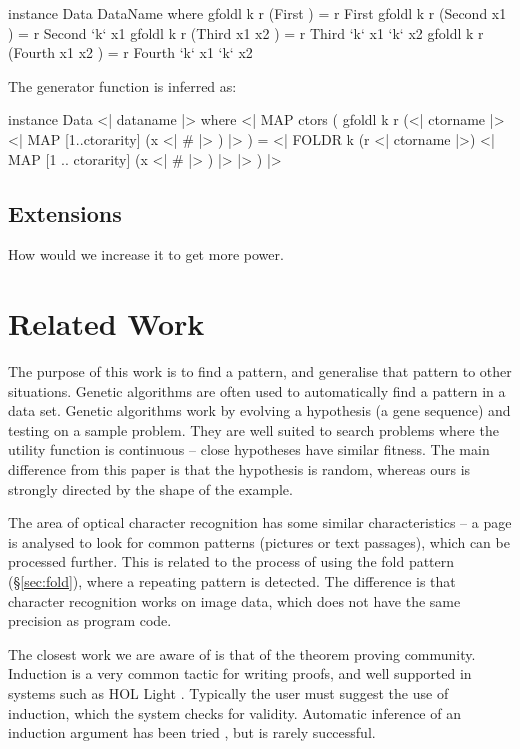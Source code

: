 \documentclass[preprint]{sigplanconf}
\begin{document}
\begin{code}
instance Data DataName where
    gfoldl k r (First          ) = r First
    gfoldl k r (Second  x1     ) = r Second  `k` x1
    gfoldl k r (Third   x1 x2  ) = r Third   `k` x1 `k` x2
    gfoldl k r (Fourth  x1 x2  ) = r Fourth  `k` x1 `k` x2
\end{code}

\noindent The generator function is inferred as:

\begin{code}
instance Data \? <| dataname |> where
    <| MAP ctors (
        gfoldl k r
            (<| ctorname |> \? <| MAP [1..ctorarity] (x <| # |> ) |> ) =
            <| FOLDR k (r \? <| ctorname |>)
                <| MAP [1 .. ctorarity] (x <| # |> ) |>
            |>
    ) |>
\end{code}

\subsection{Extensions}

How would we increase it to get more power.

\section{Related Work}
\label{sec:related}

The purpose of this work is to find a pattern, and generalise that pattern to other situations. Genetic algorithms \cite{genetic_algorithms} are often used to automatically find a pattern in a data set. Genetic algorithms work by evolving a hypothesis (a gene sequence) and testing on a sample problem. They are well suited to search problems where the utility function is continuous -- close hypotheses have similar fitness. The main difference from this paper is that the hypothesis is random, whereas ours is strongly directed by the shape of the example.

The area of optical character recognition \cite{ocr} has some similar characteristics -- a page is analysed to look for common patterns (pictures or text passages), which can be processed further. This is related to the process of using the fold pattern (\S\ref{sec:fold}), where a repeating pattern is detected. The difference is that character recognition works on image data, which does not have the same precision as program code.

The closest work we are aware of is that of the theorem proving community. Induction is a very common tactic for writing proofs, and well supported in systems such as HOL Light \cite{hol_light}. Typically the user must suggest the use of induction, which the system checks for validity. Automatic inference of an induction argument has been tried \cite{mintchev:reasoning}, but is rarely successful.
\end{document}
